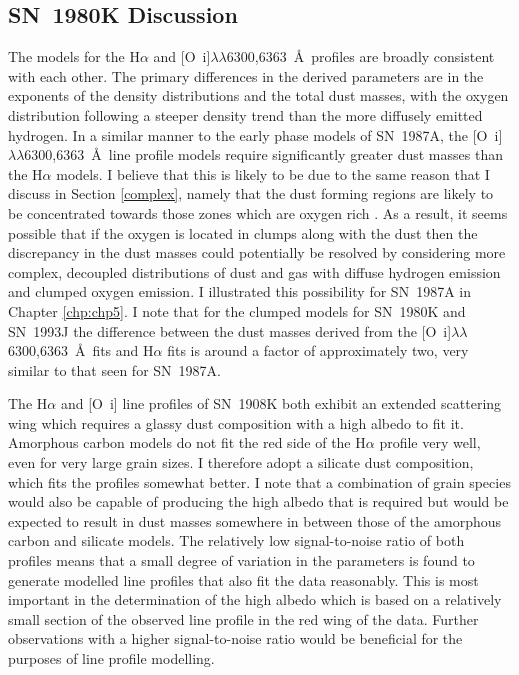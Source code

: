 \subsection{SN~1980K Discussion}
\label{scn:discuss}
 
The models for the H$\alpha$ and [O~{\sc i}]$\lambda\lambda$6300,6363~\AA\ profiles are broadly consistent with each other.  The primary differences in the derived parameters are in the exponents of the density distributions and the total dust masses, with the oxygen distribution following a steeper density trend than the more diffusely emitted hydrogen.  In a similar manner to the early phase models of SN~1987A, the [O~{\sc i}]$\lambda\lambda$6300,6363~\AA\ line profile models require significantly greater dust masses than the H$\alpha$ models. I believe that this is likely to be due to the same reason that I discuss in Section \ref{complex}, namely that the dust forming regions are likely to be concentrated towards those zones which are oxygen rich \citep{Kozma1998a}.  As a result, it seems possible that if the oxygen is  located in clumps along with the dust then the discrepancy in the dust masses could potentially be resolved by considering more complex, decoupled distributions of dust and gas with diffuse hydrogen emission and clumped oxygen emission.  I illustrated this possibility for SN~1987A in Chapter \ref{chp:chp5}.  I note that for the clumped models for SN~1980K and SN~1993J the difference between the dust masses derived from the [O~{\sc i}]$\lambda\lambda$6300,6363~\AA\ fits and H$\alpha$ fits is around a factor of approximately two, very similar to that seen for SN~1987A.  

 The H$\alpha$ and [O~{\sc i}] line profiles of SN~1908K both exhibit an extended scattering wing which requires a glassy dust composition with a high albedo to fit it.  Amorphous carbon models do not fit the red side of the H$\alpha$ profile very well, even for very large grain sizes. I therefore adopt a silicate dust composition, which fits the profiles somewhat better.  I note that a combination of grain species would also be capable of producing the high albedo that is required but would be expected to result in dust masses somewhere in between those of the amorphous carbon and silicate models.  The relatively low signal-to-noise ratio of both profiles means that a small degree of variation in the parameters is found to  generate modelled line profiles that also fit the data reasonably.  This is most important in the determination of the high albedo which is  based on a relatively small section of the observed line profile in the red wing of the data.  Further observations with a higher signal-to-noise ratio would be beneficial for the purposes of line profile modelling. 


